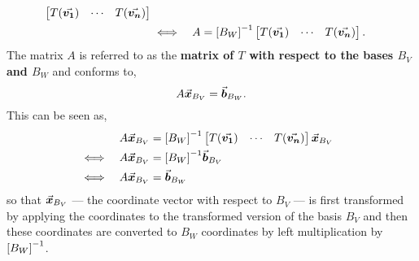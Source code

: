 \documentclass[../MathsNotesBase.tex]{subfiles}
\begin{document}
{\begin{align*}
\begin{bmatrix}
					T(\vec{\bm{v_1}}) & \cdots & T(\vec{\bm{v_n}})
					\end{bmatrix} \\
		&\iff & A &= {[B_W]}^{-1}\begin{bmatrix}
					T(\vec{\bm{v_1}}) & \cdots & T(\vec{\bm{v_n}})
					\end{bmatrix}. &\text{\scriptsize{}} \\
		\end{align*}		
		The matrix $A$ is referred to as the \textbf{matrix of $T$ with respect to the bases $B_V$ and $B_W$} and conforms to,
		\[ A\vec{\bm{x}}_{B_V} = \vec{\bm{b}}_{B_W}. \]
		This can be seen as,
		\begin{align*}
		&& A\vec{\bm{x}}_{B_V} &= {[B_W]}^{-1}\begin{bmatrix}
						T(\vec{\bm{v_1}}) & \cdots & T(\vec{\bm{v_n}})
						\end{bmatrix}\vec{\bm{x}}_{B_V} \\
		&\iff & A\vec{\bm{x}}_{B_V} &= {[B_W]}^{-1}\vec{\bm{b}}_{B_V} &\text{\scriptsize{}} \\
		&\iff & A\vec{\bm{x}}_{B_V} &= \vec{\bm{b}}_{B_W} &\text{\scriptsize{}} \\
		\end{align*}
		so that ${ \vec{\bm{x}}_{B_V} }$ --- the coordinate vector with respect to $B_V$ --- is first transformed by applying the coordinates to the transformed version of the basis $B_V$ and then these coordinates are converted to $B_W$ coordinates by left multiplication by ${[B_W]}^{-1}$.\\\\		
		
		\medskip
}
\end{document}
